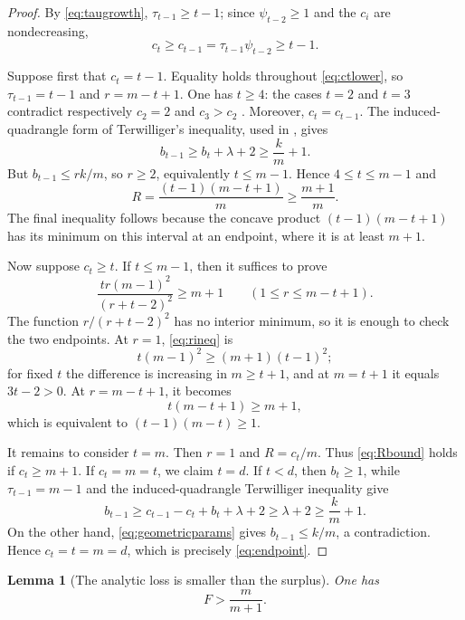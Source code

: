 \documentclass[11pt]{amsart}
\newtheorem{lemma}[theorem]{Lemma}
\theoremstyle{definition}
\begin{document}
\begin{proof}
By \eqref{eq:taugrowth}, $\tau_{t-1}\ge t-1$; since $\psi_{t-2}\ge1$ and the $c_i$ are nondecreasing,
\begin{equation}\label{eq:ctlower}
 c_t\ge c_{t-1}=\tau_{t-1}\psi_{t-2}\ge t-1.
\end{equation}

Suppose first that $c_t=t-1$.  Equality holds throughout \eqref{eq:ctlower}, so
$\tau_{t-1}=t-1$ and $r=m-t+1$.  One has $t\ge4$: the cases $t=2$ and $t=3$ contradict respectively $c_2=2$ and $c_3>c_2$ \cite[Corollary~2.8]{Kivva}.  Moreover, $c_t=c_{t-1}$.  The induced-quadrangle form of Terwilliger's inequality, used in \cite[proof of Proposition~4.6]{Kivva}, gives
\[
 b_{t-1}\ge b_t+\lambda+2\ge\frac{k}{m}+1.
\]
But $b_{t-1}\le r k/m$, so $r\ge2$, equivalently $t\le m-1$.  Hence $4\le t\le m-1$ and
\[
 R=\frac{(t-1)(m-t+1)}m\ge\frac{m+1}{m}.
\]
The final inequality follows because the concave product $(t-1)(m-t+1)$ has its minimum on this interval at an endpoint, where it is at least $m+1$.

Now suppose $c_t\ge t$.  If $t\le m-1$, then it suffices to prove
\begin{equation}\label{eq:rineq}
 \frac{t r(m-1)^2}{(r+t-2)^2}\ge m+1
 \qquad(1\le r\le m-t+1).
\end{equation}
The function $r/(r+t-2)^2$ has no interior minimum, so it is enough to check the two endpoints.  At $r=1$, \eqref{eq:rineq} is
\[
 t(m-1)^2\ge(m+1)(t-1)^2;
\]
for fixed $t$ the difference is increasing in $m\ge t+1$, and at $m=t+1$ it equals $3t-2>0$.  At $r=m-t+1$, it becomes
\[
 t(m-t+1)\ge m+1,
\]
which is equivalent to $(t-1)(m-t)\ge1$.

It remains to consider $t=m$.  Then $r=1$ and $R=c_t/m$.  Thus \eqref{eq:Rbound} holds if $c_t\ge m+1$.  If $c_t=m=t$, we claim $t=d$.  If $t<d$, then $b_t\ge1$, while $\tau_{t-1}=m-1$ and the induced-quadrangle Terwilliger inequality give
\[
 b_{t-1}\ge c_{t-1}-c_t+b_t+\lambda+2\ge\lambda+2\ge\frac{k}{m}+1.
\]
On the other hand, \eqref{eq:geometricparams} gives $b_{t-1}\le k/m$, a contradiction.  Hence $c_t=t=m=d$, which is precisely \eqref{eq:endpoint}.
\end{proof}

\begin{lemma}[The analytic loss is smaller than the surplus]\label{lem:F}
One has
\begin{equation}\label{eq:Fbound}
 F>\frac{m}{m+1}.
\end{equation}
\end{lemma}
\end{document}
